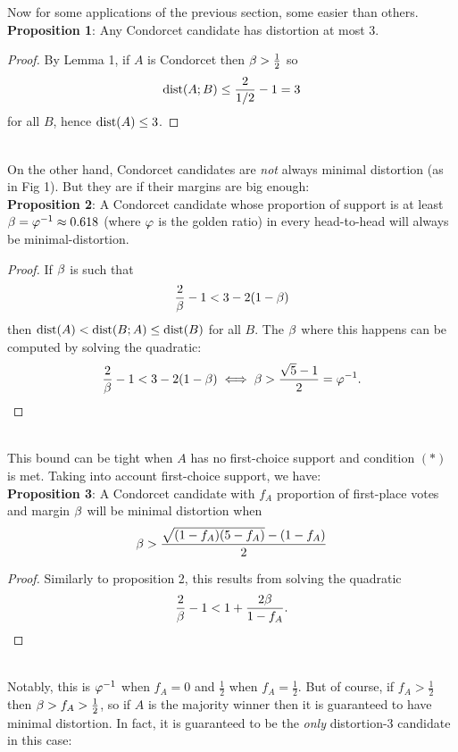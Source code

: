 \documentclass{amsart}
\DeclareMathOperator{\dist}{\rm{dist}}
\begin{document}
Now for some applications of the previous section, some easier than others.\\

\noindent \textbf{Proposition 1}: Any Condorcet candidate has distortion at most 3.
\begin{proof}
	By Lemma 1, if $A$ is Condorcet then $\beta > \tfrac12$ so 
	$$
	\dist(A;B) \leq \frac{2}{1/2} - 1 = 3
	$$
	for all $B$, hence $\dist(A)\leq 3$.
\end{proof}\\

On the other hand, Condorcet candidates are \textit{not} always minimal distortion (as in Fig 1). But they are if their margins are big enough:\\

\noindent \textbf{Proposition 2}: A Condorcet candidate whose proportion of support is at least $\beta = \varphi^{-1} \approx 0.618$ (where $\varphi$ is the golden ratio) in every head-to-head will always be minimal-distortion.
\begin{proof}
	If $\beta$ is such that
	$$
	\frac{2}{\beta} - 1 < 3 - 2(1-\beta)
	$$
	then $\dist(A) < \dist(B;A) \leq \dist(B)$ for all $B$. The $\beta$ where this happens can be computed by solving the quadratic:
	$$
	\frac{2}{\beta} - 1 < 3 - 2(1-\beta) \iff \beta > \frac{\sqrt{5}-1}{2} = \varphi^{-1}.
	$$
\end{proof}\\

This bound can be tight when $A$ has no first-choice support and condition $(\ast)$ is met. Taking into account first-choice support, we have:\\

\noindent \textbf{Proposition 3}: A Condorcet candidate with $f_A$ proportion of first-place votes and margin $\beta$ will be minimal distortion when
$$
\beta > \frac{\sqrt{(1-f_A)(5-f_A)} - (1-f_A)}{2}
$$
\begin{proof}
	Similarly to proposition 2, this results from solving the quadratic
		$$
	\frac{2}{\beta} - 1 < 1 + \frac{2\beta}{1-f_A}.
	$$
\end{proof}\\

Notably, this is $\varphi^{-1}$ when $f_A=0$ and $\tfrac12$ when $f_A=\tfrac12$. But of course, if $f_A> \tfrac12$ then $\beta>f_A>\tfrac12$, so if $A$ is the majority winner then it is guaranteed to have minimal distortion. In fact, it is guaranteed to be the \textit{only} distortion-3 candidate in this case:\\
\end{document}
